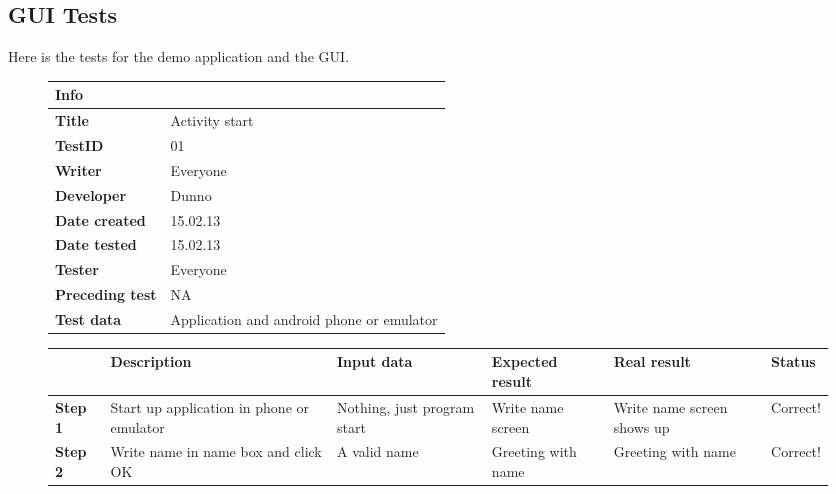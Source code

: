 \subsection{GUI Tests}
Here is the tests for the demo application and the GUI.
\begin{figure}[H]
\small

\begin{tabularx}{\textwidth }{|l|X|}
\hline
\cellcolor{blue!25}\textbf{Info} & \cellcolor{blue!25}\\
\hline
\textbf{Title} &Activity start\\
\hline
\textbf{TestID} & 01\\
\hline
\textbf{Writer}& Everyone\\
\hline
\textbf{Developer}& Dunno\\
\hline
\textbf{Date created}& 15.02.13\\
\hline
\textbf{Date tested}& 15.02.13\\
\hline
\textbf{Tester}& Everyone\\
\hline
\textbf{Preceding test}& NA\\
\hline
\textbf{Test data} & Application and android phone or emulator \\
\hline
\end{tabularx}

\begin{tabularx}{\textwidth}{|X|X|X|X|X|X|}
\hline
\cellcolor{blue!25}&
\cellcolor{blue!25}Description&
\cellcolor{blue!25}Input data&
\cellcolor{blue!25}Expected result&
\cellcolor{blue!25}Real result&
\cellcolor{blue!25}Status\\
\hline
\textbf{Step 1} & Start up application in phone or emulator & Nothing, just program start & Write name screen & Write name screen shows up & Correct!\\
\hline
\textbf{Step 2} & Write name in name box and click OK & A valid name & Greeting with name & Greeting with name & Correct!\\
\hline
\end{tabularx}
\label{fig:test01}
\end{figure}

